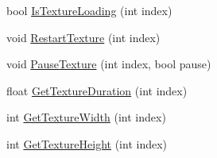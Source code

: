 \begin{DoxyCompactItemize}
bool \hyperlink{class_n_g_u_i_image_list_drawer_a6f5bdfa0d6e59d07212d73a9bdc45b63}{Is\+Texture\+Loading} (int index)
\item 
void \hyperlink{class_n_g_u_i_image_list_drawer_aa41913db8ed9727833f70310547121d6}{Restart\+Texture} (int index)
\item 
void \hyperlink{class_n_g_u_i_image_list_drawer_ab364ea546b7aeeb74480bb04015d8937}{Pause\+Texture} (int index, bool pause)
\item 
float \hyperlink{class_n_g_u_i_image_list_drawer_a92be732dc21462614504e15e5410d4c6}{Get\+Texture\+Duration} (int index)
\item 
int \hyperlink{class_n_g_u_i_image_list_drawer_a3fddaf69ac3017ced58ceafae46c378d}{Get\+Texture\+Width} (int index)
\item 
int \hyperlink{class_n_g_u_i_image_list_drawer_a6a3f5b4bfed073661addc60cfd50490d}{Get\+Texture\+Height} (int index)
\end{DoxyCompactItemize}
